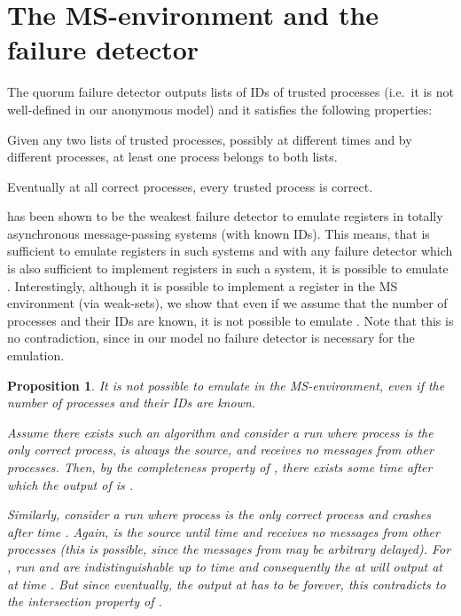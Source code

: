 \documentclass[conference, compsoc]{IEEEtran}
\newtheorem{proposition}{Proposition}
\begin{document}
\section{The MS-environment and the  failure detector}

The quorum failure detector  \cite{200377/IC} outputs lists of IDs of trusted processes (i.e.~it is not well-defined in our anonymous model) and it satisfies the following properties:
\begin{description} 
 \item[Intersection:] Given any two lists of trusted processes, possibly at different times and by different processes, at least one process belongs to both lists. 
 \item[Completeness:] Eventually at all correct processes, every trusted process is correct.
\end{description}

 has been shown to be the weakest failure detector to emulate registers in totally asynchronous message-passing systems \cite{200377/IC} (with known IDs). This means, that  is sufficient to emulate registers in such systems and with any failure detector which is also sufficient to implement registers in such a system, it is possible to emulate . 
Interestingly, although it is possible to implement a register in the MS environment (via weak-sets), we show that even if we assume that the number of processes and their IDs are known, it is not possible to emulate . Note that this is no contradiction, since in our model no failure detector is necessary for the emulation. 


\begin{proposition}
 It is not possible to emulate  in the MS-environment, even if the number of processes and their IDs are known.
 \begin{IEEEproof}
  Assume there exists such an algorithm and consider a run  where process  is the only correct process,  is always the source, and  receives no messages from other processes. Then, by the completeness property of , there exists some time  after which the output of  is .

  Similarly, consider a run  where process  is the only correct process and  crashes after time . Again,  is the source until time  and receives no messages from other processes (this is possible, since the messages from  may be arbitrary delayed). For , run  and  are indistinguishable up to time  and consequently the  at  will output  at  at time . But since eventually, the output at  has to be  forever, this contradicts to the intersection property of .
 
 \end{IEEEproof}
\end{proposition}
\end{document}
